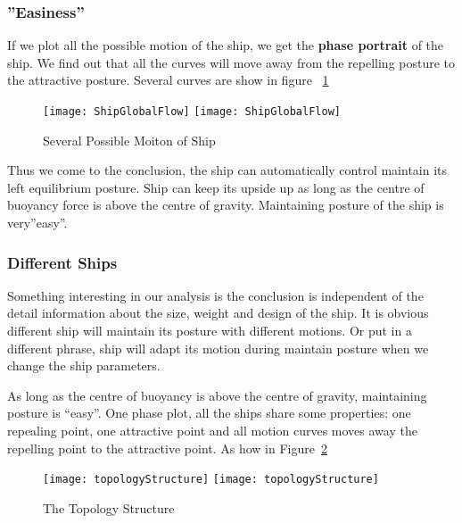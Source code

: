 \subsubsection*{''Easiness''}
If we plot all the possible motion of the ship, we get the \textbf{phase portrait} of the ship. 
We find out that all the curves will move away from the repelling posture to the attractive posture.
 Several curves are show in figure ~\ref{fig:globalflow}
\begin{figure}[!htbp]
  \begin{center}
    \leavevmode
    \ifpdf
      \texttt{[image: ShipGlobalFlow]}
    \else
      \texttt{[image: ShipGlobalFlow]}
    \fi
    \caption{Several Possible Moiton of Ship}
    \label{fig:globalflow}
  \end{center}
\end{figure}

Thus we come to the conclusion, the ship can automatically control maintain its left equilibrium posture. 
Ship can keep its upside up as long as the centre of buoyancy force is above the centre of gravity.
Maintaining posture of the ship is very”easy”.


\subsubsection*{Different Ships} 
Something interesting in our analysis is the conclusion is independent of the detail information about the size, weight and design of the ship. 
It is obvious different ship will maintain its posture with different motions. 
Or put in a different phrase, ship will adapt its motion during maintain posture when we change the ship  parameters.

As long as the centre of buoyancy is above the centre of gravity, maintaining posture is “easy”.
One phase plot, all the ships share some properties: one repealing point, one attractive point and all motion curves moves away the repelling point to the attractive point. As how in Figure~\ref{fig:topologyStructure}

\begin{figure}[!htbp]
  \begin{center}
    \leavevmode
    \ifpdf
      \texttt{[image: topologyStructure]}
    \else
      \texttt{[image: topologyStructure]}
    \fi
    \caption{The Topology Structure}
    \label{fig:topologyStructure}
  \end{center}
\end{figure}


